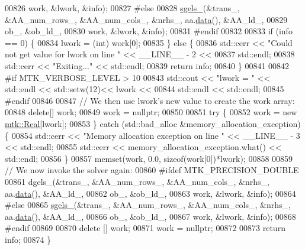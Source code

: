 \begin{DoxyCode}
00826          work, &lwork, &info);
00827 \textcolor{preprocessor}{  #else}
00828   \hyperlink{namespacemtk_ada6df1b733204aa7ff0b1ec7556288f9}{sgels\_}(&trans\_, &AA\_num\_rows\_, &AA\_num\_cols\_, &nrhs\_, aa.\hyperlink{classmtk_1_1DenseMatrix_a0c33b8a9e01d157c61ddbdf807c25d84}{data}(), &AA\_ld\_,
00829          ob\_, &ob\_ld\_,
00830          work, &lwork, &info);
00831 \textcolor{preprocessor}{  #endif}
00832 
00833   \textcolor{keywordflow}{if} (info == 0) \{
00834     lwork = (int) work[0];
00835   \} \textcolor{keywordflow}{else} \{
00836     std::cerr << \textcolor{stringliteral}{"Could not get value for lwork on line "} << \_\_LINE\_\_ - 2 <<
00837       std::endl;
00838     std::cerr << \textcolor{stringliteral}{"Exiting..."} << std::endl;
00839     \textcolor{keywordflow}{return} info;
00840   \}
00841 
00842 \textcolor{preprocessor}{  #if MTK\_VERBOSE\_LEVEL > 10}
00843   std::cout << \textcolor{stringliteral}{"lwork = "} << std::endl << std::setw(12)<< lwork <<
00844     std::endl << std::endl;
00845 \textcolor{preprocessor}{  #endif}
00846 
00847   \textcolor{comment}{// We then use lwork's new value to create the work array:}
00848   \textcolor{keyword}{delete}[] work;
00849   work = \textcolor{keyword}{nullptr};
00850 
00851   \textcolor{keywordflow}{try} \{
00852     work = \textcolor{keyword}{new} \hyperlink{group__c01-roots_gac080bbbf5cbb5502c9f00405f894857d}{mtk::Real}[lwork];
00853   \} \textcolor{keywordflow}{catch} (std::bad\_alloc &memory\_allocation\_exception) \{
00854     std::cerr << \textcolor{stringliteral}{"Memory allocation exception on line "} << \_\_LINE\_\_ - 3 << std::endl;
00855     std::cerr << memory\_allocation\_exception.what() << std::endl;
00856   \}
00857   memset(work, 0.0, \textcolor{keyword}{sizeof}(work[0])*lwork);
00858 
00859   \textcolor{comment}{// We now invoke the solver again:}
00860 \textcolor{preprocessor}{  #ifdef MTK\_PRECISION\_DOUBLE}
00861   dgels\_(&trans\_, &AA\_num\_rows\_, &AA\_num\_cols\_, &nrhs\_, aa.\hyperlink{classmtk_1_1DenseMatrix_a0c33b8a9e01d157c61ddbdf807c25d84}{data}(), &AA\_ld\_,
00862          ob\_, &ob\_ld\_,
00863          work, &lwork, &info);
00864 \textcolor{preprocessor}{  #else}
00865   \hyperlink{namespacemtk_ada6df1b733204aa7ff0b1ec7556288f9}{sgels\_}(&trans\_, &AA\_num\_rows\_, &AA\_num\_cols\_, &nrhs\_, aa.\hyperlink{classmtk_1_1DenseMatrix_a0c33b8a9e01d157c61ddbdf807c25d84}{data}(), &AA\_ld\_,
00866          ob\_, &ob\_ld\_,
00867          work, &lwork, &info);
00868 \textcolor{preprocessor}{  #endif}
00869 
00870   \textcolor{keyword}{delete} [] work;
00871   work = \textcolor{keyword}{nullptr};
00872 
00873   \textcolor{keywordflow}{return} info;
00874 \}
\end{DoxyCode}
